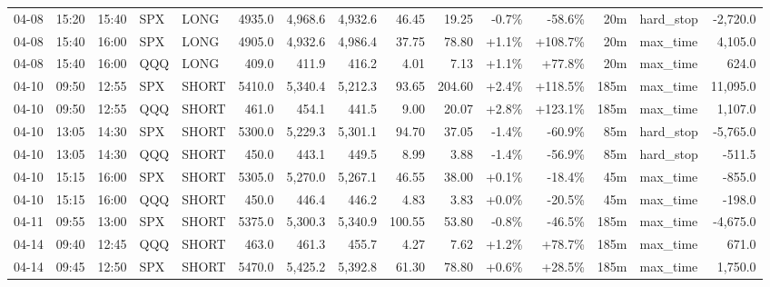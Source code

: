 \documentclass[11pt,a4paper,twoside]{article}
\begin{document}
\begin{landscape}
\begin{center}
\begin{longtable}{>{\color{txtmain}}l l l l l r r r r r r r r >{\color{txtmain}}l r}
04-08 & 15:20 & 15:40 & SPX & LONG & 4935.0 & 4,968.6 & 4,932.6 & 46.45 & 19.25 & \textcolor{lossred}{-0.7\%} & \textcolor{lossred}{-58.6\%} & 20m & hard\_stop & \textcolor{lossred}{-2,720.0} \\
04-08 & 15:40 & 16:00 & SPX & LONG & 4905.0 & 4,932.6 & 4,986.4 & 37.75 & 78.80 & \textcolor{wingreen}{+1.1\%} & \textcolor{wingreen}{+108.7\%} & 20m & max\_time & \textcolor{wingreen}{4,105.0} \\
04-08 & 15:40 & 16:00 & QQQ & LONG & 409.0 & 411.9 & 416.2 & 4.01 & 7.13 & \textcolor{wingreen}{+1.1\%} & \textcolor{wingreen}{+77.8\%} & 20m & max\_time & \textcolor{wingreen}{624.0} \\
04-10 & 09:50 & 12:55 & SPX & SHORT & 5410.0 & 5,340.4 & 5,212.3 & 93.65 & 204.60 & \textcolor{wingreen}{+2.4\%} & \textcolor{wingreen}{+118.5\%} & 185m & max\_time & \textcolor{wingreen}{11,095.0} \\
04-10 & 09:50 & 12:55 & QQQ & SHORT & 461.0 & 454.1 & 441.5 & 9.00 & 20.07 & \textcolor{wingreen}{+2.8\%} & \textcolor{wingreen}{+123.1\%} & 185m & max\_time & \textcolor{wingreen}{1,107.0} \\
04-10 & 13:05 & 14:30 & SPX & SHORT & 5300.0 & 5,229.3 & 5,301.1 & 94.70 & 37.05 & \textcolor{lossred}{-1.4\%} & \textcolor{lossred}{-60.9\%} & 85m & hard\_stop & \textcolor{lossred}{-5,765.0} \\
04-10 & 13:05 & 14:30 & QQQ & SHORT & 450.0 & 443.1 & 449.5 & 8.99 & 3.88 & \textcolor{lossred}{-1.4\%} & \textcolor{lossred}{-56.9\%} & 85m & hard\_stop & \textcolor{lossred}{-511.5} \\
04-10 & 15:15 & 16:00 & SPX & SHORT & 5305.0 & 5,270.0 & 5,267.1 & 46.55 & 38.00 & \textcolor{wingreen}{+0.1\%} & \textcolor{lossred}{-18.4\%} & 45m & max\_time & \textcolor{lossred}{-855.0} \\
04-10 & 15:15 & 16:00 & QQQ & SHORT & 450.0 & 446.4 & 446.2 & 4.83 & 3.83 & \textcolor{wingreen}{+0.0\%} & \textcolor{lossred}{-20.5\%} & 45m & max\_time & \textcolor{lossred}{-198.0} \\
04-11 & 09:55 & 13:00 & SPX & SHORT & 5375.0 & 5,300.3 & 5,340.9 & 100.55 & 53.80 & \textcolor{lossred}{-0.8\%} & \textcolor{lossred}{-46.5\%} & 185m & max\_time & \textcolor{lossred}{-4,675.0} \\
04-14 & 09:40 & 12:45 & QQQ & SHORT & 463.0 & 461.3 & 455.7 & 4.27 & 7.62 & \textcolor{wingreen}{+1.2\%} & \textcolor{wingreen}{+78.7\%} & 185m & max\_time & \textcolor{wingreen}{671.0} \\
04-14 & 09:45 & 12:50 & SPX & SHORT & 5470.0 & 5,425.2 & 5,392.8 & 61.30 & 78.80 & \textcolor{wingreen}{+0.6\%} & \textcolor{wingreen}{+28.5\%} & 185m & max\_time & \textcolor{wingreen}{1,750.0} \\

\end{longtable}
\end{center}
\end{landscape}
\end{document}
